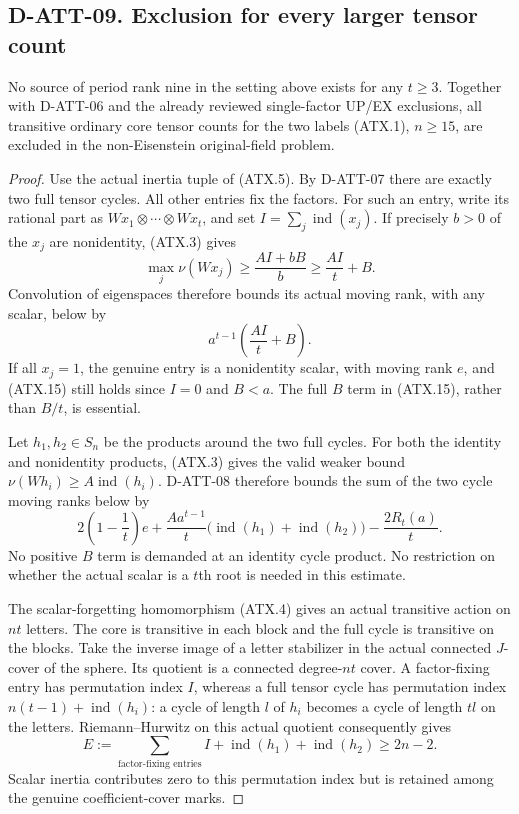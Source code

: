 \subsection*{D-ATT-09. Exclusion for every larger tensor count}

\begin{theorem}[D-ATT-09]
No source of period rank nine in the setting above exists for
any $t\ge3$.  Together with D-ATT-06 and the already reviewed
single-factor UP/EX exclusions, all transitive ordinary core
tensor counts for the two labels (ATX.1), $n\ge15$, are excluded
in the non-Eisenstein original-field problem.
\end{theorem}

\begin{proof}
Use the actual inertia tuple of (ATX.5).  By D-ATT-07 there are
exactly two full tensor cycles.  All other entries fix the
factors.  For such an entry, write its rational part as
$Wx_1\otimes\cdots\otimes Wx_t$, and set
$I=\sum_j\operatorname{ind}(x_j)$.  If precisely $b>0$ of the
$x_j$ are nonidentity, (ATX.3) gives
\[
 \max_j\nu(Wx_j)\ge\frac{AI+bB}{b}
                 \ge\frac{AI}{t}+B.
 \tag{ATX.14}
\]
Convolution of eigenspaces therefore bounds its actual moving
rank, with any scalar, below by
\[
                         a^{t-1}\left(\frac{AI}{t}+B\right).
 \tag{ATX.15}
\]
If all $x_j=1$, the genuine entry is a nonidentity scalar, with
moving rank $e$, and (ATX.15) still holds since $I=0$ and $B<a$.
The full $B$ term in (ATX.15), rather than $B/t$, is essential.

Let $h_1,h_2\in S_n$ be the products around the two full cycles.
For both the identity and nonidentity products, (ATX.3) gives the
valid weaker bound $\nu(Wh_i)\ge A\operatorname{ind}(h_i)$.
D-ATT-08 therefore bounds the sum of the two cycle moving ranks
below by
\[
 2\left(1-\frac1t\right)e
  +\frac{Aa^{t-1}}t\bigl(\operatorname{ind}(h_1)
                         +\operatorname{ind}(h_2)\bigr)
  -\frac{2R_t(a)}t.
 \tag{ATX.16}
\]
No positive $B$ term is demanded at an identity cycle product.
No restriction on whether the actual scalar is a $t$th root
is needed in this estimate.

The scalar-forgetting homomorphism (ATX.4) gives an actual
transitive action on $nt$ letters.  The core is transitive in
each block and the full cycle is transitive on the blocks.
Take the inverse image of a letter stabilizer in the actual
connected $J$-cover of the sphere.  Its quotient is a connected
degree-$nt$ cover.  A factor-fixing entry has permutation index
$I$, whereas a full tensor cycle has permutation index
$n(t-1)+\operatorname{ind}(h_i)$: a cycle of length $l$ of $h_i$
becomes a cycle of length $tl$ on the letters.
Riemann--Hurwitz on this actual quotient consequently gives
\[
 E:=\sum_{\text{factor-fixing entries}} I
       +\operatorname{ind}(h_1)+\operatorname{ind}(h_2)
       \ge2n-2.
 \tag{ATX.17}
\]
Scalar inertia contributes zero to this permutation index but
is retained among the genuine coefficient-cover marks.


\end{proof}
